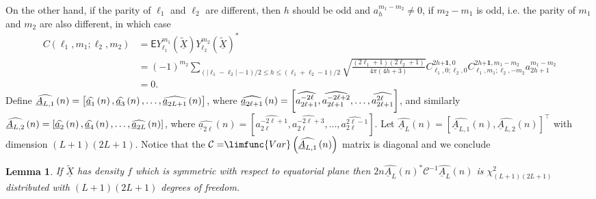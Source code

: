 \documentclass[preprint,11pt,a4paper]{elsarticle}
\newtheorem{lemma}[theorem]{Lemma}
\begin{document}
On the other hand, if the parity of $\ell_{1}$ and $\ell_{2}$ are different,
then $h$ should be odd and $a_{h}^{m_{1}-m_{2}}\neq0$, if $m_{2}-m_{1}$ is
odd, i.e. the parity of $m_{1}$ and $m_{2}$ are also different, in which
case 
\begin{align*}
C\left( \ell_{1},m_{1};\ell_{2},m_{2}\right) & =\mathsf{E}%
Y_{\ell_{1}}^{m_{1}}\left( \underline{\widetilde{X}}\right)
Y_{\ell_{2}}^{m_{2}}\left( \underline{\widetilde{X}}\right) ^{\ast} \\
& =\left( -1\right) ^{m_{2}}\sum_{\left( \left\vert \ell_{1}-\ell
_{2}\right\vert -1\right) /2\leq h\leq\left( \ell_{1}+\ell_{2}-1\right) /2}%
\sqrt{\frac{\left( 2\ell_{1}+1\right) \left( 2\ell_{2}+1\right) }{4\pi\left(
4h+3\right) }}C_{\ell_{1},0;\ell_{2},0}^{2h\boldsymbol{+1}%
,0}C_{\ell_{1},m_{1};\ell_{2},-m_{2}}^{2h\boldsymbol{+1}%
,m_{1}-m_{2}}a_{2h+1}^{m_{1}-m_{2}} \\
& =0.
\end{align*}
Define $\widehat{\underline{A}_{L,1}}\left( n\right) =\left[ \widehat{%
\underline{a}_{1}}\left( n\right) ,\widehat{\underline{a}_{3}}\left(
n\right) ,\ldots,\widehat{\underline{a}_{2L+1}}\left( n\right) \right] $,
where $\widehat{\underline{a}_{2\ell+1}}\left( n\right) =\left[ \widehat{%
a_{2\ell+1}^{-2\ell}},\widehat{a_{2\ell+1}^{-2\ell+2}},\ldots ,\widehat{%
a_{2\ell+1}^{2\ell}}\right] $, and similarly $\widehat{\underline{A}_{L,2}}%
\left( n\right) =\left[ \widehat{\underline{a}_{2}}\left( n\right) ,\widehat{%
\underline{a}_{4}}\left( n\right) ,\ldots,\widehat{\underline{a}_{2L}}\left(
n\right) \right] $, where $\widehat{\underline{a}_{2\ell}}\left( n\right) =%
\left[ \widehat{a_{2\ell}^{-2\ell+1}},\widehat{a_{2\ell}^{-2\ell+3}},\ldots ,%
\widehat{a_{2\ell}^{2\ell-1}}\right] $. Let $\widehat{\underline{A}_{L}}%
\left( n\right) =\left[ \widehat{\underline{A}_{L,1}}\left( n\right) ,%
\widehat{\underline{A}_{L,2}}\left( n\right) \right] ^{\top}$ with dimension 
$\left( L+1\right) \left( 2L+1\right) $. Notice that the $\mathcal{C=}%
\limfunc{Var}\left( \widehat{\underline{A}_{L,1}}\left( n\right) \right) $
matrix is diagonal and we conclude

\begin{lemma}
If $\underline{\widetilde{X}}$ has density $f$ which is symmetric with
respect to equatorial plane then $2n\widehat{\underline{A}_{L}}\left(
n\right) ^{\ast}\mathcal{C}^{-1}\widehat{\underline{A}_{L}}\left( n\right) $
is $\chi_{\left( L+1\right) \left( 2L+1\right) }^{2}$ distributed with $%
\left( L+1\right) \left( 2L+1\right) $ degrees of freedom.
\end{lemma}
\end{document}
